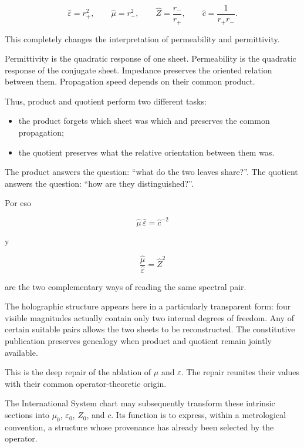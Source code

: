 \[
\widehat\varepsilon=r_+^2,
\qquad
\widehat\mu=r_-^2,
\qquad
\widehat Z=\frac{r_-}{r_+},
\qquad
\widehat c=\frac1{r_+r_-}.
\]

This completely changes the interpretation of permeability and permittivity.\par

Permittivity is the quadratic response of one sheet. Permeability is the quadratic response of the conjugate sheet. Impedance preserves the oriented relation between them. Propagation speed depends on their common product.\par

Thus, product and quotient perform two different tasks:\par

\begin{itemize}[leftmargin=*,itemsep=0.35em]
\item the product forgets which sheet was which and preserves the common propagation;
\item the quotient preserves what the relative orientation between them was.
\end{itemize}

The product answers the question: “what do the two leaves share?”. The quotient answers the question: “how are they distinguished?”.\par

Por eso\par

\[
\widehat\mu\,\widehat\varepsilon=\widehat c^{-2}
\]

y\par

\[
\frac{\widehat\mu}{\widehat\varepsilon}
=
\widehat Z^2
\]

are the two complementary ways of reading the same spectral pair.\par

The holographic structure appears here in a particularly transparent form: four visible magnitudes actually contain only two internal degrees of freedom. Any of certain suitable pairs allows the two sheets to be reconstructed. The constitutive publication preserves genealogy when product and quotient remain jointly available.\par

This is the deep repair of the ablation of \(\mu\) and \(\varepsilon\). The repair reunites their values with their common operator-theoretic origin.\par

The International System chart may subsequently transform these intrinsic sections into \(\mu_0\), \(\varepsilon_0\), \(Z_0\), and \(c\). Its function is to express, within a metrological convention, a structure whose provenance has already been selected by the operator.\par

